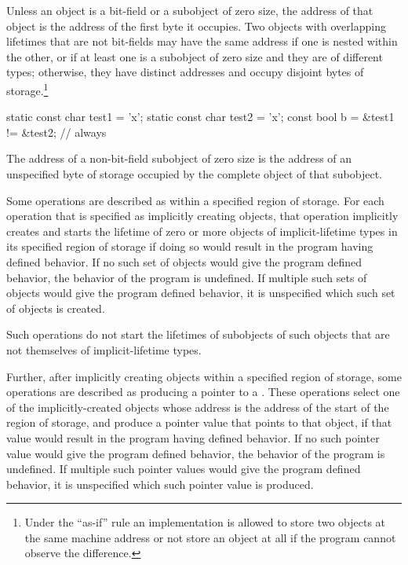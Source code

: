\pnum
{}%
%
Unless an object is a bit-field or a subobject of zero size, the
address of that object is the address of the first byte it occupies.
Two objects
with overlapping lifetimes
that are not bit-fields
may have the same address
if one is nested within the other,
or
if at least one is a subobject of zero size
and they are of different types;
otherwise, they have distinct addresses
and occupy disjoint bytes of storage.\footnote{Under the ``as-if'' rule an
implementation is allowed to store two objects at the same machine address or
not store an object at all if the program cannot observe the
difference.}
\begin{example}
\begin{codeblock}
static const char test1 = 'x';
static const char test2 = 'x';
const bool b = &test1 != &test2;        // always 
\end{codeblock}
\end{example}
The address of a non-bit-field subobject of zero size is
the address of an unspecified byte of storage
occupied by the complete object of that subobject.

\pnum
Some operations are described as
within a specified region of storage.
For each operation that is specified as implicitly creating objects,
that operation implicitly creates and starts the lifetime of
zero or more objects of implicit-lifetime types
in its specified region of storage
if doing so would result in the program having defined behavior.
If no such set of objects would give the program defined behavior,
the behavior of the program is undefined.
If multiple such sets of objects would give the program defined behavior,
it is unspecified which such set of objects is created.
\begin{note}
Such operations do not start the lifetimes of subobjects of such objects
that are not themselves of implicit-lifetime types.
\end{note}

\pnum
Further, after implicitly creating objects within a specified region of storage,
some operations are described as producing a pointer to a
.
These operations select one of the implicitly-created objects
whose address is the address of the start of the region of storage,
and produce a pointer value that points to that object,
if that value would result in the program having defined behavior.
If no such pointer value would give the program defined behavior,
the behavior of the program is undefined.
If multiple such pointer values would give the program defined behavior,
it is unspecified which such pointer value is produced.

